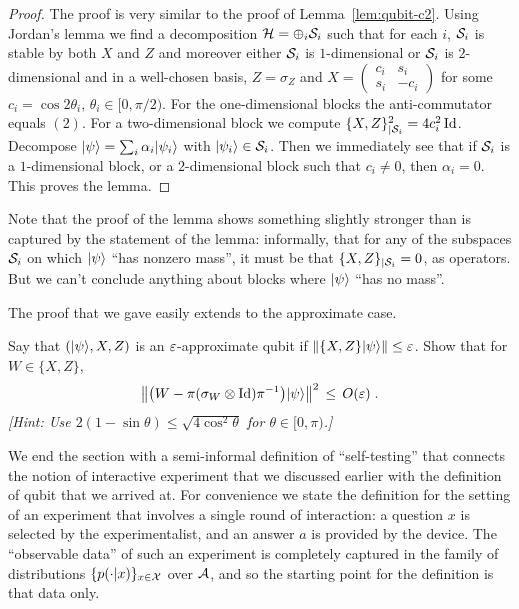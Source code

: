 \begin{proof}
The proof is very similar to the proof of Lemma~\ref{lem:qubit-c2}. Using Jordan's lemma we find a decomposition $\mathcal{H} = \oplus_i \mathcal{S}_i$ such that for each $i$, $\mathcal{S}_i$ is stable by both $X$ and $Z$ and moreover either $\mathcal{S}_i$ is $1$-dimensional or $\mathcal{S}_i$ is $2$-dimensional and in a well-chosen basis, $Z = \sigma_Z$ and $X = \begin{pmatrix} c_i & s_i \\ s_i & -c_i \end{pmatrix}$ for some $c_i = \cos 2\theta_i$, $\theta_i \in [0,\pi/2)$. For the one-dimensional blocks the anti-commutator equals $(2)$. For a two-dimensional block we compute $\{X,Z\}^2_{|\mathcal{S}_i} = 4 c_i^2 \mathop{\rm Id}\nolimits$. Decompose $|\psi\rangle = \sum_i \alpha_i |\psi_i\rangle$ with $|\psi_i\rangle \in \mathcal{S}_i$. Then we immediately see that if $\mathcal{S}_i$ is a $1$-dimensional block, or a $2$-dimensional block such that $c_i \neq 0$, then $\alpha_i = 0$. This proves the lemma. 
\end{proof}

Note that the proof of the lemma shows something slightly stronger than is captured by the statement of the lemma: informally, that for any of the subspaces $\mathcal{S}_i$ on which $|\psi\rangle$ ``has nonzero mass'', it must be that $\{X,Z\}_{|\mathcal{S}_i}=0$, as operators. But we can't conclude anything about blocks where $|\psi\rangle$ ``has no mass''. 

The proof that we gave easily extends to the approximate case. 

\begin{exercise}
Say that $(|\psi\rangle,X,Z)$ is an $\varepsilon$-approximate qubit if $\|\{X,Z\}|\psi\rangle\|\leq \varepsilon$. Show that for $W\in \{X,Z\}$, 
\[ \big\|\big( W - \pi (\sigma_W \otimes \mathop{\rm Id}\nolimits )\pi^{-1} \big)|\psi\rangle\big\|^2 \,\leq\, O({\varepsilon})\;.\] 
\emph{[Hint: Use $2(1-\sin\theta) \leq \sqrt{4\cos^2\theta}$ for $\theta\in[0,\pi)$.]}
\end{exercise}

We end the section with a semi-informal definition of ``self-testing'' that connects the notion of interactive experiment that we discussed earlier with the definition of qubit that we arrived at. For convenience we state the definition for the setting of an experiment that involves a single round of interaction: a question $x$ is selected by the experimentalist, and an answer $a$ is provided by the device. The ``observable data'' of such an experiment is completely captured in the family of distributions $\{p(\cdot|x)\}_{x\in \mathcal{X}}$ over $\mathcal{A}$, and so the starting point for the definition is that data only. 

